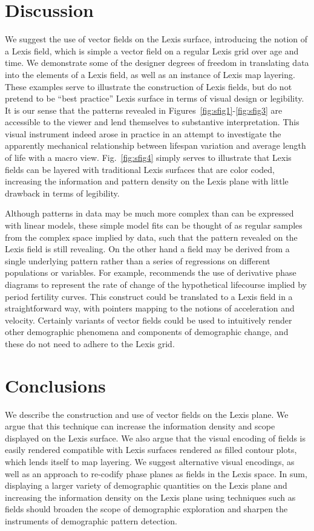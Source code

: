 \documentclass{article}
\begin{document}
\section{Discussion}
We suggest the use of vector fields on the Lexis surface, introducing the notion of a Lexis field, which is simple a vector field on a regular Lexis grid over age and time. We demonstrate some of the designer degrees of freedom in translating data into the elements of a Lexis field, as well as an instance of Lexis map layering. These examples serve to illustrate the construction of Lexis fields, but do not pretend to be ``best practice'' Lexis surface in terms of visual design or legibility. It is our sense that the patterns revealed in Figures~\ref{fig:sfig1}-\ref{fig:sfig3} are accessible to the viewer and lend themselves to substantive interpretation. This visual instrument indeed arose in practice in an attempt to investigate the apparently mechanical relationship between lifespan variation and average length of life with a macro view. Fig.~\ref{fig:sfig4} simply serves to illustrate that Lexis fields can be layered with traditional Lexis surfaces that are color coded, increasing the information and pattern density on the Lexis plane with little drawback in terms of legibility. 

Although patterns in data may be much more complex than can be expressed with linear models, these simple model fits can be thought of as regular samples from the complex space implied by data, such that the pattern revealed on the Lexis field is still revealing. On the other hand a field may be derived from a single underlying pattern rather than a series of regressions on different populations or variables. For example, \citet{shang2018visualizing} recommends the use of derivative phase diagrams to represent the rate of change of the hypothetical lifecourse implied by period fertility curves. This construct could be translated to a Lexis field in a straightforward way, with pointers mapping to the notions of acceleration and velocity. Certainly variants of vector fields could be used to intuitively render other demographic phenomena and components of demographic change, and these do not need to adhere to the Lexis grid.

\section{Conclusions}
We describe the construction and use of vector fields on the Lexis plane. We argue that this technique can increase the information density and scope displayed on the Lexis surface. We also argue that the visual encoding of fields is easily rendered compatible with Lexis surfaces rendered as filled contour plots, which lends itself to map layering. We suggest alternative visual encodings, as well as an approach to re-codify phase planes as fields in the Lexis space. In sum, displaying a larger variety of demographic quantities on the Lexis plane and increasing the information density on the Lexis plane using techniques such as fields should broaden the scope of demographic exploration and sharpen the instruments of demographic pattern detection.

\nocite{vaupel1987thousands}
\nocite{weiskopf2007vector}
\FloatBarrier
\singlespacing

   
\end{document}
